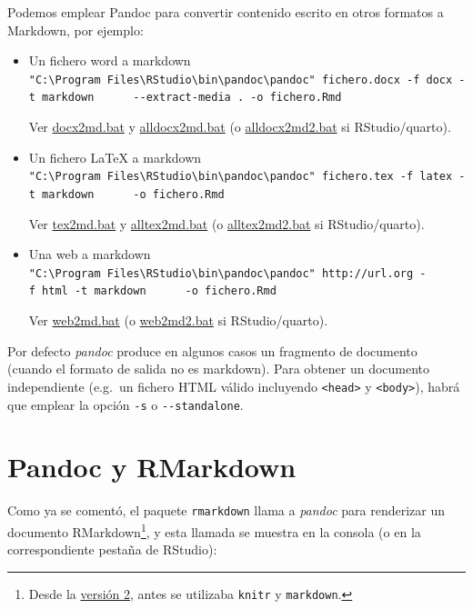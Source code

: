 \documentclass[
]{book}
\theoremstyle{break}
\theoremstyle{nonumberplain}
\begin{document}
Podemos emplear Pandoc para convertir contenido escrito en otros formatos a Markdown, por ejemplo:

\begin{itemize}
\item
  Un fichero word a markdown
  \texttt{"C:\textbackslash{}Program\ Files\textbackslash{}RStudio\textbackslash{}bin\textbackslash{}pandoc\textbackslash{}pandoc"\ fichero.docx\ -f\ docx\ -t\ markdown\ \ \ \ \ \ -\/-extract-media\ .\ -o\ fichero.Rmd}

  Ver \href{ejemplos/rmarkdown/docx2md.bat}{docx2md.bat} y \href{ejemplos/rmarkdown/alldocx2md.bat}{alldocx2md.bat} (o \href{ejemplos/rmarkdown/alldocx2md2.bat}{alldocx2md2.bat} si RStudio/quarto).
\item
  Un fichero LaTeX a markdown
  \texttt{"C:\textbackslash{}Program\ Files\textbackslash{}RStudio\textbackslash{}bin\textbackslash{}pandoc\textbackslash{}pandoc"\ fichero.tex\ -f\ latex\ -t\ markdown\ \ \ \ \ \ -o\ fichero.Rmd}

  Ver \href{ejemplos/rmarkdown/tex2md.bat}{tex2md.bat} y \href{ejemplos/rmarkdown/alltex2md.bat}{alltex2md.bat} (o \href{ejemplos/rmarkdown/alltex2md2.bat}{alltex2md2.bat} si RStudio/quarto).
\item
  Una web a markdown
  \texttt{"C:\textbackslash{}Program\ Files\textbackslash{}RStudio\textbackslash{}bin\textbackslash{}pandoc\textbackslash{}pandoc"\ http://url.org\ -f\ html\ -t\ markdown\ \ \ \ \ \ -o\ fichero.Rmd}

  Ver \href{ejemplos/rmarkdown/web2md.bat}{web2md.bat} (o \href{ejemplos/rmarkdown/web2md2.bat}{web2md2.bat} si RStudio/quarto).
\end{itemize}

Por defecto \emph{pandoc} produce en algunos casos un fragmento de documento
(cuando el formato de salida no es markdown).
Para obtener un documento independiente (e.g.~un fichero HTML válido incluyendo \texttt{\textless{}head\textgreater{}} y \texttt{\textless{}body\textgreater{}}),
habrá que emplear la opción \texttt{-s} o \texttt{-\/-standalone}.

\hypertarget{pandoc-y-rmarkdown}{%
\section{Pandoc y RMarkdown}\label{pandoc-y-rmarkdown}}

Como ya se comentó, el paquete \texttt{rmarkdown} llama a \emph{pandoc} para renderizar un documento
RMarkdown\footnote{Desde la \href{https://blog.rstudio.org/2014/06/18/r-markdown-v2/}{versión 2},
  antes se utilizaba \texttt{knitr} y \texttt{markdown}.}, y esta llamada se muestra en la consola
(o en la correspondiente pestaña de RStudio):
\end{document}
